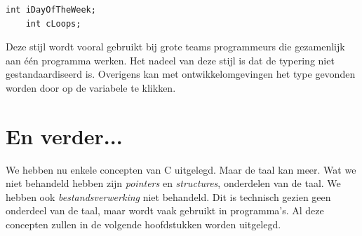 \begin{lstlisting}[caption=Voorbeel Hungarian Notation.]
    int iDayOfTheWeek;
    int cLoops;
\end{lstlisting}

Deze stijl wordt vooral gebruikt bij grote teams programmeurs die gezamenlijk aan één programma werken. Het nadeel van deze stijl is dat de typering niet gestandaardiseerd is. Overigens kan met ontwikkelomgevingen het type gevonden worden door op de variabele te klikken.

\section{En verder...}
We hebben nu enkele concepten van C uitgelegd. Maar de taal kan meer. Wat we niet behandeld hebben zijn \textsl{pointers} en \textsl{structures}, onderdelen van de taal. We hebben ook \textsl{bestandsverwerking} niet behandeld. Dit is technisch gezien geen onderdeel van de taal, maar wordt vaak gebruikt in programma's. Al deze concepten zullen in de volgende hoofdstukken worden uitgelegd.
